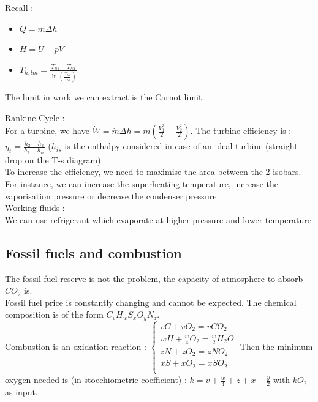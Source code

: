 \documentclass[../main.tex]{subfiles}
\begin{document}
Recall : \begin{itemize}
    \item $\dot{Q} = \dot{m} \Delta h$
    \item $H = U - pV$
    \item $T_{h,lm} = \frac{T_{h1}-T_{h2}}{\ln(\frac{T_{h1}}{T_{h2}})}$
\end{itemize}

The limit in work we can extract is the Carnot limit. 

\quad \underline{Rankine Cycle :}\\
For a turbine, we have $\dot{W} = \dot{m} \Delta h = \dot{m} (\frac{V_1^2}{2} - \frac{V_2^2}{2})$. The turbine efficiency is : $\eta_t = \frac{h_2 - h_3}{h_2 - h_{is}}$ ($h_{is}$ is the enthalpy considered in case of an ideal turbine (straight drop on the T-s diagram).\\

To increase the efficiency, we need to maximise the area between the 2 isobars. For instance, we can increase the superheating temperature, increase the vaporisation pressure or decrease the condenser pressure.\\

\quad \underline{Working fluids :}\\
We can use refrigerant which evaporate at higher pressure and lower temperature

\subsection{Fossil fuels and combustion}
The fossil fuel reserve is not the problem, the capacity of atmosphere to absorb $CO_2$ is.\\

Fossil fuel price is constantly changing and cannot be expected. The chemical composition is of the form $C_v H_w S_x O_y N_z$.\\
Combustion is an oxidation reaction : $\begin{cases}
    v C + v O_2 = vCO_2\\
    w H + \frac{w}{4} O_2 = \frac{w}{2} H_2O\\
    z N + z O_2 = zNO_2\\
    xS + xO_2 = xSO_2\\
\end{cases}$
Then the minimum oxygen needed is (in stoechiometric coefficient) : $k = v + \frac{w}{4} + z + x - \frac{y}{2}$ with $kO_2$ as input.\\
\end{document}
